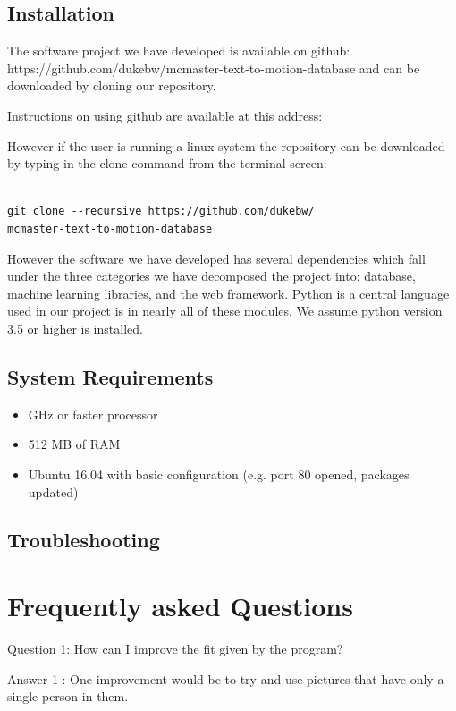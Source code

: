 \documentclass{scrreprt}
\begin{document}
\subsection{Installation}
The software project we have developed is available on github: https://github.com/dukebw/mcmaster-text-to-motion-database and can be downloaded by cloning our repository.

Instructions on using github are available at this address:

However if the user is running a linux system the repository can be downloaded by typing in the clone command from the terminal screen:
\begin{lstlisting}

git clone --recursive https://github.com/dukebw/
mcmaster-text-to-motion-database

\end{lstlisting}

However the software we have developed has several dependencies which fall under the three categories we have decomposed the project into: database, machine learning libraries, and the web framework.  Python is a central language used in our project is in nearly all of these modules.  We assume python version 3.5 or higher is installed.


\subsection{System Requirements}

\begin{itemize}
\item GHz or faster processor
\item 512 MB of RAM
\item Ubuntu 16.04 with basic configuration (e.g. port 80 opened, packages updated)
\end{itemize}


\subsection{Troubleshooting}

\section{Frequently asked Questions}

Question 1: How can I improve the fit given by the program?

Answer 1 : One improvement would be to try and use pictures that have only a single person in them. 
\end{document}
